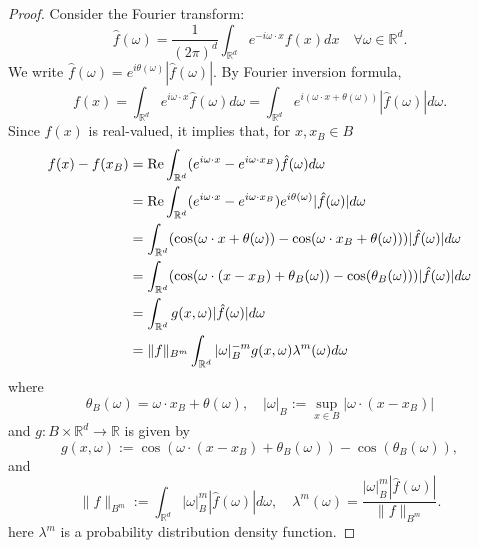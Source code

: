 \begin{proof}\small
	Consider the Fourier transform:
	\begin{equation}
	  \label{Fourier}
	  \hat f(\omega)=\frac{1}{(2\pi)^d}\int_{\mathbb{R}^d}e^{-i\omega\cdot x}f(x)dx
	  \quad \forall \omega \in \mathbb R^d.
	\end{equation}
	We write  
	$\hat{f}(\omega)=e^{i\theta(\omega)}|\hat{f}(\omega)|$. By Fourier inversion formula,
	\begin{equation}
		\label{eqn1}
		f(x)=\int_{\mathbb{R}^d}e^{i\omega\cdot x}\hat{f}(\omega)d\omega
		=\int_{\mathbb{R}^d}e^{i(\omega\cdot x+\theta(\omega))}|\hat{f}(\omega)|d\omega.
	\end{equation}
Since $f(x)$ is real-valued, it implies that, for $x, x_B\in B$
	  \begin{equation}
		\label{key}
		\begin{aligned}
			f(x)-f(x_B)
			&={\rm Re}\int_{\mathbb{R}^d}
			(e^{i\omega\cdot x}-e^{i\omega\cdot x_B}) 
			\hat{f}(\omega)d\omega \\
			&={\rm Re}\int_{\mathbb{R}^d}
			(e^{i\omega\cdot x}-e^{i\omega\cdot x_B})  
			e^{i\theta
				(\omega)}|\hat{f}(\omega)|d\omega \\
			&=\int_{\mathbb{R}^d}(\cos(\omega\cdot
			x+\theta(\omega))-\cos(\omega\cdot x_B+\theta(\omega)))|\hat{f}(\omega)|d\omega \\
			&=\int_{\mathbb{R}^d}(\cos(\omega\cdot(x-x_B)+\theta_B(\omega))-\cos(\theta_B(\omega)))|\hat{f}(\omega)|d\omega \\
			&=\int_{\mathbb{R}^d}g(x,\omega)|\hat{f}(\omega)|d\omega \\
			&=\|f\|_{B^m}\int_{\mathbb{R}^d}|\omega|_B^{-m}g(x,\omega)\lambda^m(\omega)d\omega 
		\end{aligned}
	\end{equation}
where
$$
\theta_B(\omega)=\omega\cdot x_B+\theta(\omega),\quad|\omega|_B:=\sup\limits_{x\in B}|\omega\cdot(x-x_B)|
$$
and $g: B\times \mathbb{R}^d\rightarrow \mathbb{R}$
is given by
\begin{equation}\label{gz}
	g(x,\omega):=
	\cos(\omega\cdot (x-x_B)+\theta_B(\omega))  -\cos(\theta_B(\omega)),
\end{equation}
and
$$
\|f\|_{B^m}:=\int_{\mathbb R^d}|\omega|_B^m|\hat{f}(\omega)|d\omega,\quad\lambda^m(\omega)=\frac{|\omega|_B^m|\hat{f}(\omega)|}{\|f\|_{B^m}}.
$$
here $\lambda^m$ is a  probability distribution density function. 



\end{proof}

